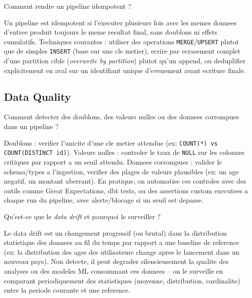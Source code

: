 \documentclass[11pt,a4paper]{article}
\begin{document}
\begin{question} Comment rendre un pipeline idempotent ?
\end{question}
\begin{reponse}
Un pipeline est idempotent si l'executer plusieurs fois avec les memes donnees d'entree produit toujours le meme resultat final, sans doublons ni effets cumulatifs. Techniques courantes : utiliser des operations \texttt{MERGE}/\texttt{UPSERT} plutot que de simples \texttt{INSERT} (base sur une cle metier), ecrire par ecrasement complet d'une partition cible (\emph{overwrite by partition}) plutot qu'un append, ou deduplifier explicitement en aval sur un identifiant unique d'evenement avant ecriture finale.
\end{reponse}

\subsection{Data Quality}

\begin{question} Comment detecter des doublons, des valeurs nulles ou des donnees corrompues dans un pipeline ?
\end{question}
\begin{reponse}
Doublons : verifier l'unicite d'une cle metier attendue (ex: \texttt{COUNT(*) vs COUNT(DISTINCT id)}). Valeurs nulles : controler le taux de \texttt{NULL} sur les colonnes critiques par rapport a un seuil attendu. Donnees corrompues : valider le schema/types a l'ingestion, verifier des plages de valeurs plausibles (ex: un age negatif, un montant aberrant). En pratique, on automatise ces controles avec des outils comme Great Expectations, dbt tests, ou des assertions custom executees a chaque run du pipeline, avec alerte/blocage si un seuil est depasse.
\end{reponse}

\begin{question} Qu'est-ce que le \emph{data drift} et pourquoi le surveiller ?
\end{question}
\begin{reponse}
Le data drift est un changement progressif (ou brutal) dans la distribution statistique des donnees au fil du temps par rapport a une baseline de reference (ex: la distribution des ages des utilisateurs change apres le lancement dans un nouveau pays). Non detecte, il peut degrader silencieusement la qualite des analyses ou des modeles ML consommant ces donnees -- on le surveille en comparant periodiquement des statistiques (moyenne, distribution, cardinalite) entre la periode courante et une reference.
\end{reponse}
\end{document}
